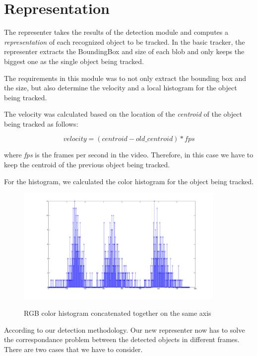 \section{Representation}

The representer takes the results of the detection module and computes a \textit{representation} of each recognized object to be tracked. In the basic tracker, the representer extracts the BoundingBox and size of each blob and only keeps the biggest one as the single object being tracked.

The requirements in this module was to not only extract the bounding box and the size, but also determine the velocity and a local histogram for the object being tracked.

The velocity was calculated based on the location of the \textit{centroid} of the object being tracked as follows:

\begin{equation}
velocity = (centroid - old\_centroid) * fps
\end{equation}

where \textit{fps} is the frames per second in the video. Therefore, in this case we have to keep the centroid of the previous object being tracked.

For the histogram, we calculated the color histogram for the object being tracked.

\begin{figure}[Color histogram]{\includegraphics[width=0.9\textwidth]{histogram_car}}
  \centering
  \caption{RGB color histogram concatenated together on the same axis}
\end{figure}

According to our detection methodology. Our new representer now has to solve the correspondance problem between the detected objects in different frames. There are two cases that we have to consider.

